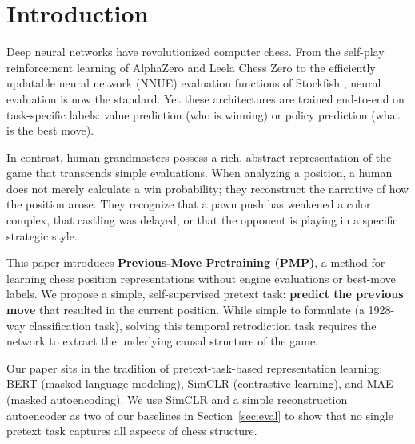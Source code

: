 \documentclass[journal]{IEEEtran}
\begin{document}
\section{Introduction}
Deep neural networks have revolutionized computer chess. From the self-play reinforcement learning of AlphaZero \cite{ref-alphazero} and Leela Chess Zero to the efficiently updatable neural network (NNUE) evaluation functions of Stockfish \cite{ref-nnue}, neural evaluation is now the standard. Yet these architectures are trained end-to-end on task-specific labels: value prediction (who is winning) or policy prediction (what is the best move). 

In contrast, human grandmasters possess a rich, abstract representation of the game that transcends simple evaluations. When analyzing a position, a human does not merely calculate a win probability; they reconstruct the narrative of how the position arose. They recognize that a pawn push has weakened a color complex, that castling was delayed, or that the opponent is playing in a specific strategic style. 

This paper introduces \textbf{Previous-Move Pretraining (PMP)}, a method for learning chess position representations without engine evaluations or best-move labels. We propose a simple, self-supervised pretext task: \textbf{predict the previous move} that resulted in the current position. While simple to formulate (a 1928-way classification task), solving this temporal retrodiction task requires the network to extract the underlying causal structure of the game.

Our paper sits in the tradition of pretext-task-based representation learning: BERT \cite{ref-bert} (masked language modeling), SimCLR \cite{ref-simclr} (contrastive learning), and MAE \cite{ref-mae} (masked autoencoding). We use SimCLR and a simple reconstruction autoencoder as two of our baselines in Section~\ref{sec:eval} to show that no single pretext task captures all aspects of chess structure.
\end{document}
